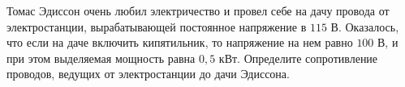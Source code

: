 Томас Эдиссон очень любил электричество и провел себе на дачу провода от электростанции, вырабатывающей постоянное напряжение в $115$ В. Оказалось, что если на даче включить кипятильник, то напряжение на нем равно $100$ В, и при этом выделяемая мощность равна $0{,}5$ кВт. Определите сопротивление проводов, ведущих от электростанции до дачи Эдиссона.
